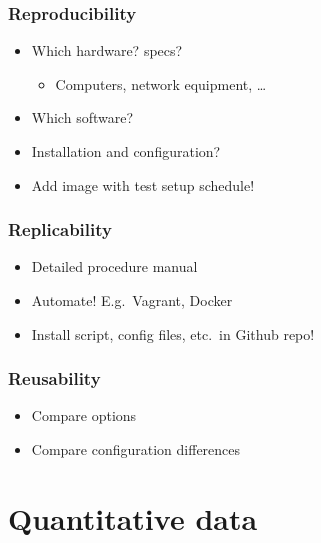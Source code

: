 \documentclass[aspectratio=169]{beamer}
\begin{document}
\begin{frame}
  \frametitle{Reproducibility}


  \bigskip

  \begin{itemize}
   \item Which hardware? specs?
   \begin{itemize}
       \item Computers, network equipment, \ldots
   \end{itemize}
   \item Which software?
   \item Installation and configuration?
   \item Add image with test setup schedule!
  \end{itemize}

\end{frame}

\begin{frame}
  \frametitle{Replicability}


  \bigskip

  \begin{itemize}
   \item Detailed procedure manual
   \item Automate! E.g.\ Vagrant, Docker
   \item Install script, config files, etc.\ in Github repo!
  \end{itemize}

\end{frame}

\begin{frame}
  \frametitle{Reusability}


  \bigskip

  \begin{itemize}
    \item Compare options
    \item Compare configuration differences
  \end{itemize}

\end{frame}

\section{Quantitative data}
\end{document}
